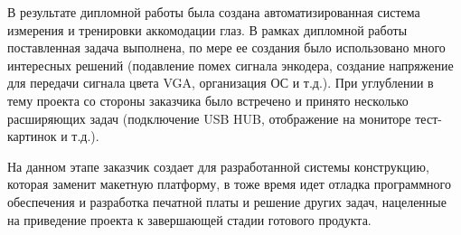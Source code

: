 В результате дипломной работы была создана автоматизированная система измерения и тренировки аккомодации глаз. В рамках дипломной работы поставленная задача выполнена, по мере ее создания было использовано много интересных решений (подавление помех сигнала энкодера, создание напряжение для передачи сигнала цвета VGA, организация ОС и т.д.). При углублении в тему проекта со стороны заказчика было встречено и принято несколько расширяющих задач (подключение USB HUB, отображение на мониторе тест-картинок и т.д.).

На данном этапе заказчик создает для разработанной системы конструкцию, которая заменит макетную платформу, в тоже время идет отладка программного обеспечения и разработка печатной платы и решение других задач, нацеленные на приведение проекта к завершающей стадии готового продукта.
